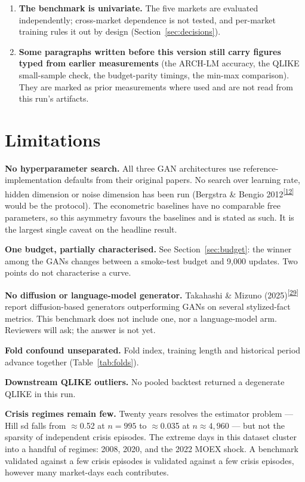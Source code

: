 \documentclass[11pt,a4paper]{article}
\makeatletter
\newcommand{\tcite}[1]{\textsuperscript{[\hyperlink{R:#1}{#1}]}}
\DeclareRobustCommand{\_}{\ifmmode\nfss@text{\textunderscore}\else\textunderscore\allowbreak\fi}
\makeatother
\begin{document}
\begin{enumerate}[leftmargin=1.6em,itemsep=6pt]
\item \textbf{The benchmark is univariate.} The five markets are evaluated independently; cross-market dependence is not tested, and per-market training rules it out by design (Section~\ref{sec:decisions}).
\item \textbf{Some paragraphs written before this version still carry figures typed from earlier measurements} (the ARCH-LM accuracy, the QLIKE small-sample check, the budget-parity timings, the min-max comparison). They are marked as prior measurements where used and are not read from this run's artifacts.
\end{enumerate}

\section{Limitations}
\label{sec:limitations}
\textbf{No hyperparameter search.} All three GAN architectures use reference-implementation defaults from their original papers. No search over learning rate, hidden dimension or noise dimension has been run (Bergstra \& Bengio 2012\tcite{12} would be the protocol). The econometric baselines have no comparable free parameters, so this asymmetry favours the baselines and is stated as such. It is the largest single caveat on the headline result.

\textbf{One budget, partially characterised.} See Section~\ref{sec:budget}: the winner among the GANs changes between a smoke-test budget and 9,000 updates. Two points do not characterise a curve.

\textbf{No diffusion or language-model generator.} Takahashi \& Mizuno (2025)\tcite{29} report diffusion-based generators outperforming GANs on several stylized-fact metrics. This benchmark does not include one, nor a language-model arm. Reviewers will ask; the answer is not yet.

\textbf{Fold confound unseparated.} Fold index, training length and historical period advance together (Table~\ref{tab:folds}).

\textbf{Downstream QLIKE outliers.} No pooled backtest returned a degenerate QLIKE in this run.

\textbf{Crisis regimes remain few.} Twenty years resolves the estimator problem --- Hill sd falls from $\approx$0.52 at $n=995$ to $\approx$0.035 at $n\approx4{,}960$ --- but not the sparsity of independent crisis episodes. The extreme days in this dataset cluster into a handful of regimes: 2008, 2020, and the 2022 MOEX shock. A benchmark validated against a few crisis episodes is validated against a few crisis episodes, however many market-days each contributes.
\end{document}
